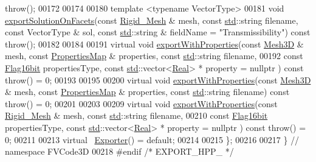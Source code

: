 \begin{DoxyCode}
      throw();
00172 
00174 
00180     template <typename VectorType>
00181     \textcolor{keywordtype}{void} \hyperlink{classFVCode3D_1_1Exporter_ad63ad608ca43fdc5da73ee26c0ce9004}{exportSolutionOnFacets}(const \hyperlink{classFVCode3D_1_1Rigid__Mesh}{Rigid\_Mesh} & mesh, const 
      \hyperlink{namespacestd}{std}::\textcolor{keywordtype}{string} filename, const VectorType & sol, const \hyperlink{namespacestd}{std}::\textcolor{keywordtype}{string} & fieldName = "Transmissibility") 
      const throw();
00182 
00184 
00191     virtual \textcolor{keywordtype}{void} \hyperlink{classFVCode3D_1_1Exporter_a8736cac571095709897065eb806f9d42}{exportWithProperties}(const \hyperlink{classFVCode3D_1_1Mesh3D}{Mesh3D} & mesh, const 
      \hyperlink{classFVCode3D_1_1PropertiesMap}{PropertiesMap} & properties, const \hyperlink{namespacestd}{std}::\textcolor{keywordtype}{string} filename,
00192         const \hyperlink{namespaceFVCode3D_a17a9cb86e2e25bbfbfcb645a2eec1d64}{Flag16bit} propertiesType, const \hyperlink{namespacestd}{std}::vector<\hyperlink{namespaceFVCode3D_a40c1f5588a248569d80aa5f867080e83}{Real}> * property = \textcolor{keywordtype}{nullptr} ) 
      const throw() = 0;
00193 
00195 
00200     virtual \textcolor{keywordtype}{void} \hyperlink{classFVCode3D_1_1Exporter_a8736cac571095709897065eb806f9d42}{exportWithProperties}(const \hyperlink{classFVCode3D_1_1Mesh3D}{Mesh3D} & mesh, const 
      \hyperlink{classFVCode3D_1_1PropertiesMap}{PropertiesMap} & properties, const \hyperlink{namespacestd}{std}::\textcolor{keywordtype}{string} filename) const throw() = 0;
00201 
00203 
00209     virtual \textcolor{keywordtype}{void} \hyperlink{classFVCode3D_1_1Exporter_a8736cac571095709897065eb806f9d42}{exportWithProperties}(const \hyperlink{classFVCode3D_1_1Rigid__Mesh}{Rigid\_Mesh} & mesh, const 
      \hyperlink{namespacestd}{std}::\textcolor{keywordtype}{string} filename,
00210         const \hyperlink{namespaceFVCode3D_a17a9cb86e2e25bbfbfcb645a2eec1d64}{Flag16bit} propertiesType, const \hyperlink{namespacestd}{std}::vector<\hyperlink{namespaceFVCode3D_a40c1f5588a248569d80aa5f867080e83}{Real}> * property = \textcolor{keywordtype}{nullptr} ) 
      const throw() = 0;
00211 
00213     virtual ~\hyperlink{classFVCode3D_1_1Exporter}{Exporter}() = default;
00214 
00215 \};
00216 
00217 \} \textcolor{comment}{// namespace FVCode3D}
00218 \textcolor{preprocessor}{#endif }\textcolor{comment}{/* EXPORT\_HPP\_ */}\textcolor{preprocessor}{}
\end{DoxyCode}

